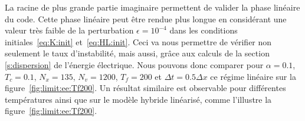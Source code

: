 La racine de plus grande partie imaginaire permettent de valider la phase lin\'eaire du code. Cette phase lin\'eaire peut \^etre rendue plus 
longue en consid\'erant une valeur très faible de la perturbation $\epsilon=10^{-4}$ dans les conditions initiales~\eqref{eq:K:init} et~\eqref{eq:HL:init}. Ceci va nous permettre de v\'erifier non seulement le taux d'instabilit\'e, mais aussi, gr\^ace aux calculs de la section \ref{s:dispersion} de l'\'energie \'electrique. Nous pouvons donc comparer pour $\alpha = 0.1$, $T_c=0.1$, $N_x=135$, $N_v=1200$, $T_f=200$ et $\Delta t = 0.5\Delta x$ ce régime linéaire sur la figure~\ref{fig:limit:ee:Tf200}. Un résultat similaire est observable pour différentes températures ainsi que sur le modèle hybride linéarisé, comme l'illustre la figure~\ref{fig:limit:ee:Tf200}. 
